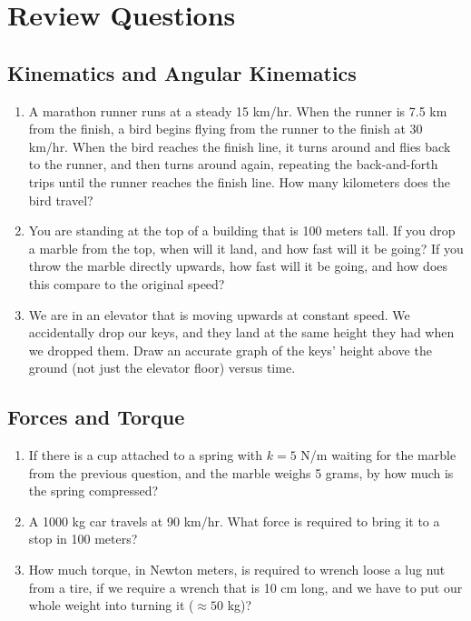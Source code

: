 \documentclass[10pt]{article}
\begin{document}
\maketitle

\section{Review Questions}
\subsection{Kinematics and Angular Kinematics}
\begin{enumerate}
\item A marathon runner runs at a steady 15 km/hr.  When the runner is 7.5 km from the finish, a bird begins flying from the runner to the finish at 30 km/hr.  When the bird reaches the finish line, it turns around and flies back to the runner, and then turns around again, repeating the back-and-forth trips until the runner reaches the finish line.  How many kilometers does the bird travel?
\item You are standing at the top of a building that is 100 meters tall.  If you drop a marble from the top, when will it land, and how fast will it be going?  If you throw the marble directly upwards, how fast will it be going, and how does this compare to the original speed?
\item We are in an elevator that is moving upwards at constant speed.  We accidentally drop our keys, and they land at the same height they had when we dropped them.  Draw an accurate graph of the keys' height above the ground (not just the elevator floor) versus time.
\end{enumerate}
\subsection{Forces and Torque}
\begin{enumerate}
\item If there is a cup attached to a spring with $k=5$ N/m waiting for the marble from the previous question, and the marble weighs 5 grams, by how much is the spring compressed?
\item A 1000 kg car travels at 90 km/hr.  What force is required to bring it to a stop in 100 meters?
\item How much torque, in Newton meters, is required to wrench loose a lug nut from a tire, if we require a wrench that is 10 cm long, and we have to put our whole weight into turning it ($\approx 50$ kg)?
\end{enumerate}
\end{document}

